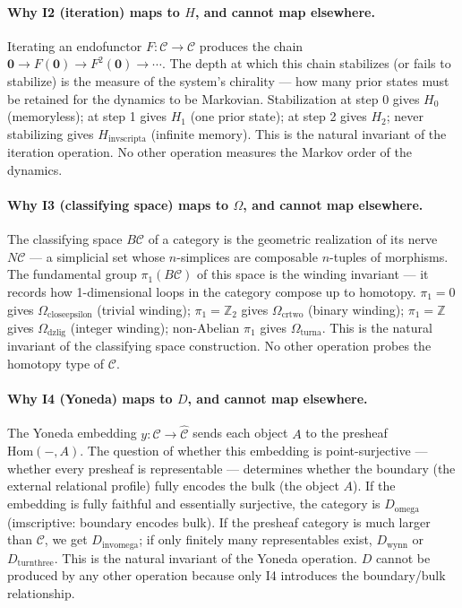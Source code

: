 \documentclass[12pt,a4paper]{article}
\begin{document}
\paragraph{Why I2 (iteration) maps to $H$, and cannot map elsewhere.}
Iterating an endofunctor $F: \mathcal{C} \to \mathcal{C}$ produces the chain $\mathbf{0} \to F(\mathbf{0}) \to F^2(\mathbf{0}) \to \cdots$. The depth at which this chain stabilizes (or fails to stabilize) is the measure of the system's chirality --- how many prior states must be retained for the dynamics to be Markovian. Stabilization at step 0 gives $H_0$ (memoryless); at step 1 gives $H_1$ (one prior state); at step 2 gives $H_2$; never stabilizing gives $H_{\text{invscripta}}$ (infinite memory). This is the natural invariant of the iteration operation. No other operation measures the Markov order of the dynamics.

\paragraph{Why I3 (classifying space) maps to $\Omega$, and cannot map elsewhere.}
The classifying space $B\mathcal{C}$ of a category is the geometric realization of its nerve $N\mathcal{C}$ --- a simplicial set whose $n$-simplices are composable $n$-tuples of morphisms. The fundamental group $\pi_1(B\mathcal{C})$ of this space is the winding invariant --- it records how 1-dimensional loops in the category compose up to homotopy. $\pi_1 = 0$ gives $\Omega_{\text{closeepsilon}}$ (trivial winding); $\pi_1 = \mathbb{Z}_2$ gives $\Omega_{\text{crtwo}}$ (binary winding); $\pi_1 = \mathbb{Z}$ gives $\Omega_{\text{dzlig}}$ (integer winding); non-Abelian $\pi_1$ gives $\Omega_{\text{turna}}$. This is the natural invariant of the classifying space construction. No other operation probes the homotopy type of $\mathcal{C}$.

\paragraph{Why I4 (Yoneda) maps to $D$, and cannot map elsewhere.}
The Yoneda embedding $y: \mathcal{C} \to \hat{\mathcal{C}}$ sends each object $A$ to the presheaf $\text{Hom}(-,A)$. The question of whether this embedding is point-surjective --- whether every presheaf is representable --- determines whether the boundary (the external relational profile) fully encodes the bulk (the object $A$). If the embedding is fully faithful and essentially surjective, the category is $D_{\text{omega}}$ (imscriptive: boundary encodes bulk). If the presheaf category is much larger than $\mathcal{C}$, we get $D_{\text{invomega}}$; if only finitely many representables exist, $D_{\text{wynn}}$ or $D_{\text{turnthree}}$. This is the natural invariant of the Yoneda operation. $D$ cannot be produced by any other operation because only I4 introduces the boundary/bulk relationship.
\end{document}
